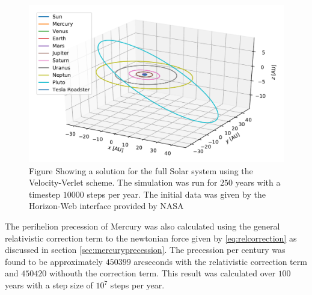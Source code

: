 \documentclass[twocolumn]{aastex62}
\begin{document}
\begin{figure}
\includegraphics[scale=1]{Figures/OuterSolarSystem.pdf}
\caption{Figure Showing a solution for the full Solar system using the Velocity-Verlet scheme. The simulation was run for $250$ years with a timestep $10000$ steps per year. The initial data was given by the Horizon-Web interface provided by NASA}
\label{fig:inner}
\end{figure}

The perihelion precession of Mercury was also calculated using the general
relativistic correction term to the newtonian force given by
\ref{eq:relcorrection} as discussed in section \ref{sec:mercuryprecession}. The
precession per century was found to be approximately $450399$ arcseconds with
the relativistic correction term and $450420$ withouth the correction term. This
result was calculated over $100$ years with a step size of $10^7$ steps per year.
\end{document}
